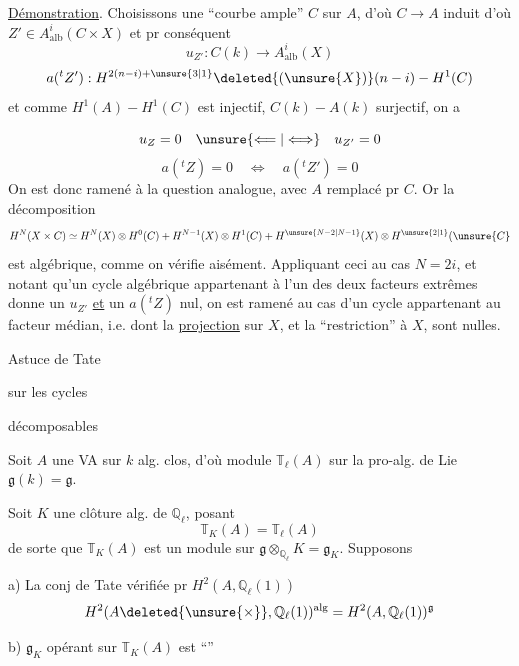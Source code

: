 \uline{Démonstration}. Choisissons une ``courbe ample'' \(C\) sur \(A\),  d'où \(C\longrightarrow A\) induit
d'où \(Z'\in A^i_{\mathrm{alb}}(C\times X)\) et pr conséquent
\[
u_{Z'}:C(k)\longrightarrow A^i_{\mathrm{alb}}(X)
\]
\[
a({}^tZ'):H^{2(n-i)+\unsure{3|1}}\deleted{(\unsure{X})}(n-i)\mathbin{-}H^1(C)
\]
et comme \(H^1(A)\mathbin{-}H^1(C)\) est injectif, \(C(k)\mathbin{-}A(k)\) surjectif, on a


\[
u_Z=0\quad\unsure{\Longleftarrow|\Longleftrightarrow}\quad u_{Z'}=0
\]
\[
a({}^tZ)=0\quad\Longleftrightarrow\quad a({}^tZ')=0
\]
On est donc ramené à la question analogue, avec \(A\) remplacé pr \(C\). Or   la décomposition
\[
H^N(X\times C)\simeq H^N(X)\otimes H^0(C)+H^{N-1}(X)\otimes H^1(C)+H^{\unsure{N-2|N-1}}(X)\otimes H^{\unsure{2|1}}(\unsure{C}
\]
est algébrique, comme  on vérifie aisément. Appliquant ceci au cas \(N=2i\), et notant qu'un cycle algébrique appartenant à l'un des deux facteurs extrêmes donne un \(u_{Z'}\) \uline{et} un \(a({}^tZ)\) nul, on est ramené au cas d'un cycle appartenant au facteur médian, i.e. dont la \uline{projection} sur \(X\), et la ``restriction'' à \(X\), sont nulles.


Astuce de Tate

sur les cycles

décomposables



Soit $A$ une VA sur $k$ alg. clos, d'où module $\mathbb{T}_\ell(A)$ \deleted{$\unsure{\otimes}$} sur la pro-alg. de Lie  $\mathfrak{g}(k)=\mathfrak{g}$.

Soit $K$ une clôture alg. de $\mathbb{Q}_\ell$, posant
\[
\mathbb{T}_K(A)=\mathbb{T}_\ell(A)
\]
de sorte que $\mathbb{T}_K(A)$ est un module sur $\mathfrak{g}\otimes_{\mathbb{Q}_\ell}K=\mathfrak{g}_K$. Supposons

a) La  conj de Tate vérifiée pr $H^2(A,\mathbb{Q}_\ell(1))$
\[
H^2(A\deleted{\unsure{\times}},\mathbb{Q}_\ell(1))^{\mathrm{alg}}
=H^2(A,\mathbb{Q}_\ell(1))^{\mathfrak{g}}
\]

b) $\mathfrak{g}_K$ opérant sur  $\mathbb{T}_K(A)$ est ``''

